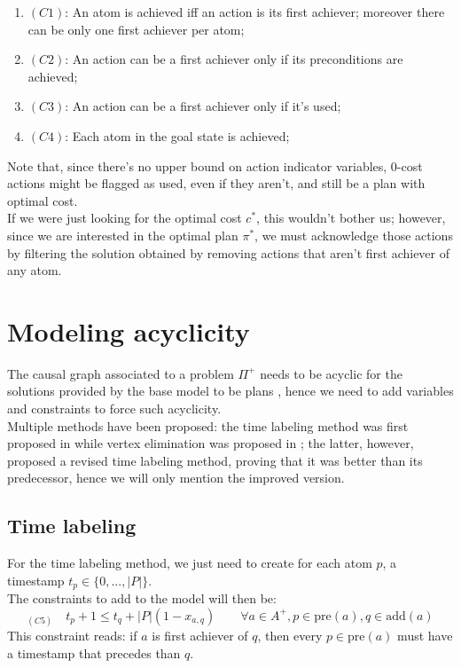 \begin{enumerate}
    \item[]$(C1)$: An atom is achieved iff an action is its first achiever; moreover there can be only one first achiever per atom;
    \item[]$(C2)$: An action can be a first achiever only if its preconditions are achieved;
    \item[]$(C3)$: An action can be a first achiever only if it's used;
    \item[]$(C4)$: Each atom in the goal state is achieved;
\end{enumerate}
Note that, since there's no upper bound on action indicator variables, 0-cost actions might be flagged as used, even if they aren't, and still be a plan with optimal cost.\\
If we were just looking for the optimal cost $c^*$, this wouldn't bother us; however, since we are interested in the optimal plan $\pi^*$, we must acknowledge those actions by filtering the solution obtained by removing actions that aren't first achiever of any atom.

\section{Modeling acyclicity}
The causal graph associated to a problem $\Pi^+$ needs to be acyclic for the solutions provided by the base model to be plans \cite{Rankooh_22}, hence we need to add variables and constraints to force such acyclicity.\\
Multiple methods have been proposed: the time labeling method was first proposed in \cite{Imai_15} while vertex elimination was proposed in \cite{Rankooh_22}; the latter, however, proposed a revised time labeling method, proving that it was better than its predecessor, hence we will only mention the improved version.

\subsection{Time labeling}
For the time labeling method, we just need to create for each atom $p$, a timestamp $t_p\in\{0,...,|P|\}$.\\
The constraints to add to the model will then be:
$$_{(C5)}\quad t_p + 1 \leq t_q + |P|(1-x_{a, q})\qquad\forall a\in A^+,p\in \mbox{pre}(a),q\in \mbox{add}(a)$$
This constraint reads: if $a$ is first achiever of $q$, then every $p\in \mbox{pre}(a)$ must have a timestamp that precedes than $q$.

